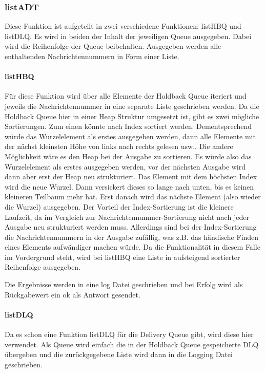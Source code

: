 \subsubsection{listADT}

Diese Funktion ist aufgeteilt in zwei verschiedene Funktionen: listHBQ und listDLQ. 
Es wird in beiden der Inhalt der jeweiligen Queue ausgegeben. Dabei wird die Reihenfolge der Queue beibehalten. Ausgegeben werden alle enthaltenden Nachrichtennummern in Form einer Liste. 

\paragraph{listHBQ}
Für diese Funktion wird über alle Elemente der Holdback Queue iteriert und jeweils die Nachrichtennummer in eine separate Liste geschrieben werden. 
Da die Holdback Queue hier in einer Heap Struktur umgesetzt ist, gibt es zwei mögliche Sortierungen. Zum einen könnte nach Index sortiert werden. Dementsprechend würde das Wurzelelement als erstes ausgegeben werden, dann alle Elemente mit der nächst kleinsten Höhe von links nach rechts gelesen usw..
Die andere Möglichkeit wäre es den Heap bei der Ausgabe zu sortieren. Es würde also das Wurzelelement als erstes ausgegeben werden, vor der nächsten Ausgabe wird dann aber erst der Heap neu strukturiert. Das Element mit dem höchsten Index wird die neue Wurzel. Dann versickert dieses so lange nach unten, bis es keinen kleineren Teilbaum mehr hat. Erst danach wird das nächste Element (also wieder die Wurzel) ausgegeben. 
Der Vorteil der Index-Sortierung ist die kleinere Laufzeit, da im Vergleich zur Nachrichtennummer-Sortierung nicht nach jeder Ausgabe neu strukturiert werden muss. Allerdings sind bei der Index-Sortierung die Nachrichtennummern in der Ausgabe zufällig, was z.B. das händische Finden eines Elements aufwändiger machen würde. 
Da die Funktionalität in diesem Falle im Vordergrund steht, wird bei listHBQ eine Liste in aufsteigend sortierter Reihenfolge ausgegeben. 

Die Ergebnisse werden in eine log Datei geschrieben und bei Erfolg wird als Rückgabewert ein ok als Antwort gesendet.

\paragraph{listDLQ}
Da es schon eine Funktion listDLQ für die Delivery Queue gibt, wird diese hier verwendet. 
Als Queue wird einfach die in der Holdback Queue gespeicherte DLQ übergeben und die zurückgegebene Liste wird dann in die Logging Datei geschrieben. 

